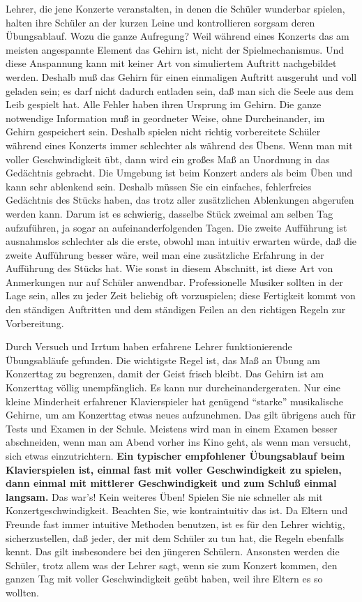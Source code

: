 Lehrer, die jene Konzerte veranstalten, in denen die Schüler wunderbar spielen, halten ihre Schüler an der kurzen Leine und kontrollieren sorgsam deren Übungsablauf.
Wozu die ganze Aufregung?
Weil während eines Konzerts das am meisten angespannte Element das Gehirn ist, nicht der Spielmechanismus.
Und diese Anspannung kann mit keiner Art von simuliertem Auftritt nachgebildet werden.
Deshalb muß das Gehirn für einen einmaligen Auftritt ausgeruht und voll geladen sein; es darf nicht dadurch entladen sein, daß man sich die Seele aus dem Leib gespielt hat.
Alle Fehler haben ihren Ursprung im Gehirn.
Die ganze notwendige Information muß in geordneter Weise, ohne Durcheinander, im Gehirn gespeichert sein.
Deshalb spielen nicht richtig vorbereitete Schüler während eines Konzerts immer schlechter als während des Übens.
Wenn man mit voller Geschwindigkeit übt, dann wird ein großes Maß an Unordnung in das Gedächtnis gebracht.
Die Umgebung ist beim Konzert anders als beim Üben und kann sehr ablenkend sein.
Deshalb müssen Sie ein einfaches, fehlerfreies Gedächtnis des Stücks haben, das trotz aller zusätzlichen Ablenkungen abgerufen werden kann.
Darum ist es schwierig, dasselbe Stück zweimal am selben Tag aufzuführen, ja sogar an aufeinanderfolgenden Tagen.
Die zweite Aufführung ist ausnahmslos schlechter als die erste, obwohl man intuitiv erwarten würde, daß die zweite Aufführung besser wäre, weil man eine zusätzliche Erfahrung in der Aufführung des Stücks hat.
Wie sonst in diesem Abschnitt, ist diese Art von Anmerkungen nur auf Schüler anwendbar.
Professionelle Musiker sollten in der Lage sein, alles zu jeder Zeit beliebig oft vorzuspielen; diese Fertigkeit kommt von den ständigen Auftritten und dem ständigen Feilen an den richtigen Regeln zur Vorbereitung.

Durch Versuch und Irrtum haben erfahrene Lehrer funktionierende Übungsabläufe gefunden.
Die wichtigste Regel ist, das Maß an Übung am Konzerttag zu begrenzen, damit der Geist frisch bleibt.
Das Gehirn ist am Konzerttag völlig unempfänglich.
Es kann nur durcheinandergeraten.
Nur eine kleine Minderheit erfahrener Klavierspieler hat genügend \enquote{starke} musikalische Gehirne, um am Konzerttag etwas neues aufzunehmen.
Das gilt übrigens auch für Tests und Examen in der Schule.
Meistens wird man in einem Examen besser abschneiden, wenn man am Abend vorher ins Kino geht, als wenn man versucht, sich etwas einzutrichtern.
\textbf{Ein typischer empfohlener Übungsablauf beim Klavierspielen ist, einmal fast mit voller Geschwindigkeit zu spielen, dann einmal mit mittlerer Geschwindigkeit und zum Schluß einmal langsam.}
Das war's! Kein weiteres Üben!
Spielen Sie nie schneller als mit Konzertgeschwindigkeit.
Beachten Sie, wie kontraintuitiv das ist.
Da Eltern und Freunde fast immer intuitive Methoden benutzen, ist es für den Lehrer wichtig, sicherzustellen, daß jeder, der mit dem Schüler zu tun hat, die Regeln ebenfalls kennt.
Das gilt insbesondere bei den jüngeren Schülern.
Ansonsten werden die Schüler, trotz allem was der Lehrer sagt, wenn sie zum Konzert kommen, den ganzen Tag mit voller Geschwindigkeit geübt haben, weil ihre Eltern es so wollten.


